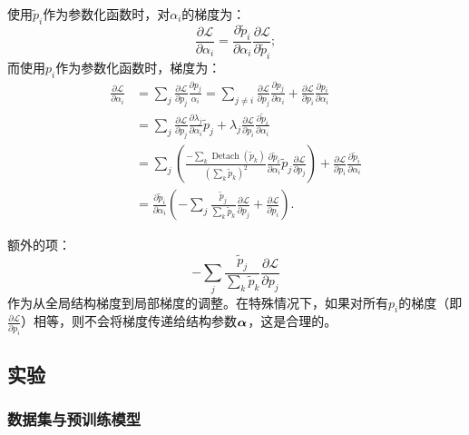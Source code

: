 使用$\tilde{p}_i$作为参数化函数时，对$\alpha_i$的梯度为：
\begin{equation}
\frac{\partial {\mathcal{L}}}{\partial \alpha_i} = \frac{\partial{\tilde{p}}_i}{\partial{\alpha_i}}\frac{\partial{{\mathcal{L}}}}{\partial{\tilde{p}_i}};
\end{equation}
而使用$p_i$作为参数化函数时，梯度为：
\begin{align}
\frac{\partial {\mathcal{L}}}{\partial \alpha_i} & = \sum_j \frac{\partial {\mathcal{L}}}{\partial{p}_j} \frac{\partial{p_j}}{\alpha_i} = \sum_{j\neq i} \frac{\partial {\mathcal{L}}}{\partial{p}_j} \frac{\partial{p_j}}{\partial\alpha_i} + \frac{\partial {\mathcal{L}}}{\partial{p}_i} \frac{\partial{p_i}}{\partial\alpha_i} \\ 
& = \sum_{j} \frac{\partial{{\mathcal{L}}}}{\partial p_j}\frac{\partial\lambda_j}{\partial \alpha_i} \tilde{p}_j + \lambda_j \frac{\partial{{\mathcal{L}}}}{\partial p_i}\frac{\partial\tilde{p}_i}{\partial{\alpha_i}} \\
& = \sum_{j}\left(\frac{-\sum_k\operatorname{Detach}(\tilde{p}_k)}{(\sum_k \tilde{p}_k)^2}\frac{\partial{\tilde{p}_i}}{\partial{\alpha_i}}\tilde{p}_j\frac{\partial{{\mathcal{L}}}}{\partial{p}_j}\right) + \frac{\partial{{\mathcal{L}}}}{\partial p_i}\frac{\partial\tilde{p}_i}{\partial{\alpha_i}}  \\
& = \frac{\partial\tilde{p}_i}{\partial{\alpha_i}} \left(-\sum_j\frac{\tilde{p}_j}{\sum_k{\tilde{p}_k}}\frac{\partial{{\mathcal{L}}}}{\partial{p_j}} + \frac{\partial{{\mathcal{L}}}}{\partial{p_i}}\right).
\end{align}

额外的项：
\begin{equation}
    -\sum_j\frac{\tilde{p}_j}{\sum_k{\tilde{p}_k}}\frac{\partial{{\mathcal{L}}}}{\partial{{p}_j}} 
\end{equation}
作为从全局结构梯度到局部梯度的调整。在特殊情况下，如果对所有$p_i$的梯度（即$\frac{\partial{{\mathcal{L}}}}{\partial{{p}_i}}$）相等，则不会将梯度传递给结构参数$\boldsymbol{\alpha}$，这是合理的。




\subsection{实验}

\subsubsection{数据集与预训练模型}

